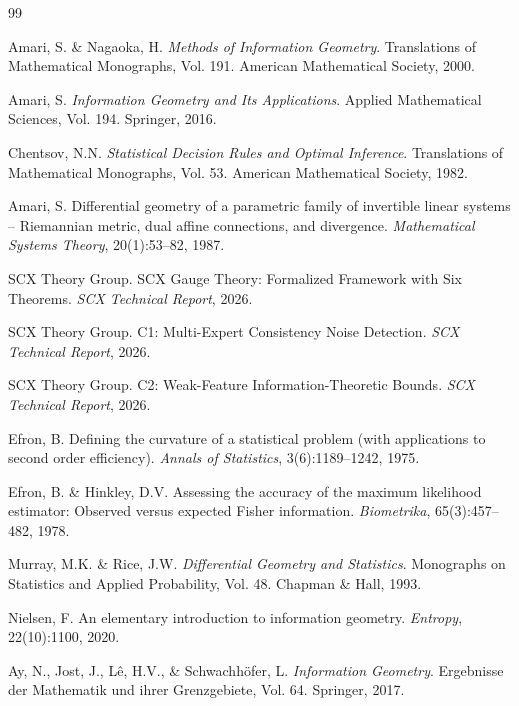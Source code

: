 \documentclass[12pt,a4paper]{article}
\theoremstyle{plain}
\theoremstyle{definition}
\theoremstyle{remark}
\newcommand{\SCX}{\textsf{SCX}}
\begin{document}
\begin{thebibliography}{99}

Amari, S. \& Nagaoka, H. \textit{Methods of Information Geometry}. Translations of Mathematical Monographs, Vol. 191. American Mathematical Society, 2000.

Amari, S. \textit{Information Geometry and Its Applications}. Applied Mathematical Sciences, Vol. 194. Springer, 2016.

Chentsov, N.N. \textit{Statistical Decision Rules and Optimal Inference}. Translations of Mathematical Monographs, Vol. 53. American Mathematical Society, 1982.

Amari, S. Differential geometry of a parametric family of invertible linear systems -- Riemannian metric, dual affine connections, and divergence. \textit{Mathematical Systems Theory}, 20(1):53--82, 1987.

\SCX{} Theory Group. \SCX{} Gauge Theory: Formalized Framework with Six Theorems. \textit{\SCX{} Technical Report}, 2026.

\SCX{} Theory Group. C1: Multi-Expert Consistency Noise Detection. \textit{\SCX{} Technical Report}, 2026.

\SCX{} Theory Group. C2: Weak-Feature Information-Theoretic Bounds. \textit{\SCX{} Technical Report}, 2026.

Efron, B. Defining the curvature of a statistical problem (with applications to second order efficiency). \textit{Annals of Statistics}, 3(6):1189--1242, 1975.

Efron, B. \& Hinkley, D.V. Assessing the accuracy of the maximum likelihood estimator: Observed versus expected Fisher information. \textit{Biometrika}, 65(3):457--482, 1978.

Murray, M.K. \& Rice, J.W. \textit{Differential Geometry and Statistics}. Monographs on Statistics and Applied Probability, Vol. 48. Chapman \& Hall, 1993.

Nielsen, F. An elementary introduction to information geometry. \textit{Entropy}, 22(10):1100, 2020.

Ay, N., Jost, J., L\^{e}, H.V., \& Schwachh\"{o}fer, L. \textit{Information Geometry}. Ergebnisse der Mathematik und ihrer Grenzgebiete, Vol. 64. Springer, 2017.


\end{thebibliography}
\end{document}

